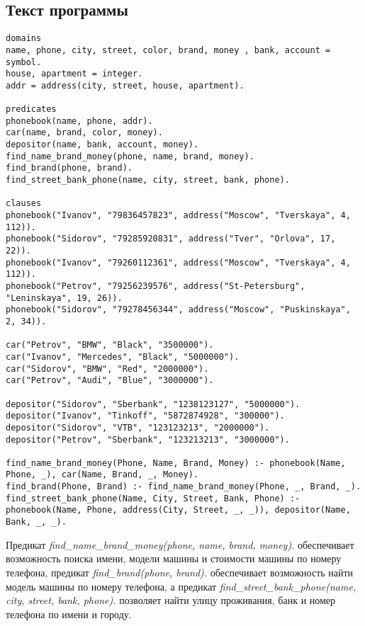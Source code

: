 \documentclass[a4paper,12pt]{article}
\begin{document}
\newpage

\subsection*{Текст программы}
\begin{lstlisting}[caption=База знаний]
domains 
name, phone, city, street, color, brand, money , bank, account = symbol. 
house, apartment = integer. 
addr = address(city, street, house, apartment). 

predicates 
phonebook(name, phone, addr). 
car(name, brand, color, money). 
depositor(name, bank, account, money). 
find_name_brand_money(phone, name, brand, money). 
find_brand(phone, brand). 
find_street_bank_phone(name, city, street, bank, phone). 

clauses 
phonebook("Ivanov", "79836457823", address("Moscow", "Tverskaya", 4, 112)). 
phonebook("Sidorov", "79285920831", address("Tver", "Orlova", 17, 22)). 
phonebook("Ivanov", "79260112361", address("Moscow", "Tverskaya", 4, 112)). 
phonebook("Petrov", "79256239576", address("St-Petersburg", "Leninskaya", 19, 26)). 
phonebook("Sidorov", "79278456344", address("Moscow", "Puskinskaya", 2, 34)). 

car("Petrov", "BMW", "Black", "3500000"). 
car("Ivanov", "Mercedes", "Black", "5000000"). 
car("Sidorov", "BMW", "Red", "2000000"). 
car("Petrov", "Audi", "Blue", "3000000"). 

depositor("Sidorov", "Sberbank", "1238123127", "5000000"). 
depositor("Ivanov", "Tinkoff", "5872874928", "300000"). 
depositor("Sidorov", "VTB", "123123213", "2000000"). 
depositor("Petrov", "Sberbank", "123213213", "3000000"). 

find_name_brand_money(Phone, Name, Brand, Money) :- phonebook(Name, Phone, _), car(Name, Brand, _, Money). 
find_brand(Phone, Brand) :- find_name_brand_money(Phone, _, Brand, _). 
find_street_bank_phone(Name, City, Street, Bank, Phone) :- phonebook(Name, Phone, address(City, Street, _, _)), depositor(Name, Bank, _, _). 
\end{lstlisting}
Предикат \emph{find\_name\_brand\_money(phone, name, brand, money).} обеспечивает возможность поиска имени, модели машины и стоимости машины по номеру телефона, предикат \emph{find\_brand(phone, brand).} обеспечивает возможность найти модель машины по номеру телефона, а предикат \emph{find\_street\_bank\_phone(name, city, street, bank, phone).} позволяет найти улицу проживания, банк и номер телефона по имени и городу.

 \newpage
 
\end{document}
